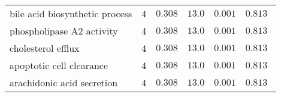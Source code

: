 \begin{longtable}{|l|r|r|r|r|r|}
    bile acid biosynthetic process                        & 4                       & $ 0.308$                & $  13.0$     & $ 0.001$             & $ 0.813~~$                      \\
    phospholipase A2 activity                             & 4                       & $ 0.308$                & $  13.0$     & $ 0.001$             & $ 0.813~~$                      \\
    cholesterol efflux                                    & 4                       & $ 0.308$                & $  13.0$     & $ 0.001$             & $ 0.813~~$                      \\
    apoptotic cell clearance                              & 4                       & $ 0.308$                & $  13.0$     & $ 0.001$             & $ 0.813~~$                      \\
    arachidonic acid secretion                            & 4                       & $ 0.308$                & $  13.0$     & $ 0.001$             & $ 0.813~~$                      \\
\end{longtable}
